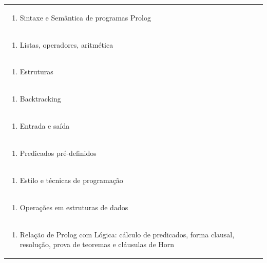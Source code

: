 \documentclass[11pt]{article}
\begin{document}
\begin{center}
\begin{longtable}{|p{4cm}|p{4cm}|p{4cm}|p{4cm}|}
\multicolumn{4}{|p{\dimexpr 16cm + 6\tabcolsep\relax}|}{\begin{enumerate}[start=3]\item Sintaxe e Semântica de programas Prolog\end{enumerate}}\\
\multicolumn{4}{|p{\dimexpr 16cm + 6\tabcolsep\relax}|}{\begin{enumerate}[start=4]\item Listas, operadores, aritmética\end{enumerate}}\\
\multicolumn{4}{|p{\dimexpr 16cm + 6\tabcolsep\relax}|}{\begin{enumerate}[start=5]\item Estruturas\end{enumerate}}\\
\multicolumn{4}{|p{\dimexpr 16cm + 6\tabcolsep\relax}|}{\begin{enumerate}[start=6]\item Backtracking\end{enumerate}}\\
\multicolumn{4}{|p{\dimexpr 16cm + 6\tabcolsep\relax}|}{\begin{enumerate}[start=7]\item Entrada e saída\end{enumerate}}\\
\multicolumn{4}{|p{\dimexpr 16cm + 6\tabcolsep\relax}|}{\begin{enumerate}[start=8]\item Predicados pré-definidos\end{enumerate}}\\
\multicolumn{4}{|p{\dimexpr 16cm + 6\tabcolsep\relax}|}{\begin{enumerate}[start=9]\item Estilo e técnicas de programação\end{enumerate}}\\
\multicolumn{4}{|p{\dimexpr 16cm + 6\tabcolsep\relax}|}{\begin{enumerate}[start=10]\item Operações em estruturas de dados\end{enumerate}}\\
\multicolumn{4}{|p{\dimexpr 16cm + 6\tabcolsep\relax}|}{\begin{enumerate}[start=11]\item Relação de Prolog com Lógica: cálculo de predicados, forma clausal, resolução, prova de teoremas e cláusulas de Horn\end{enumerate}}\\

\end{longtable}
\end{center}
\end{document}
